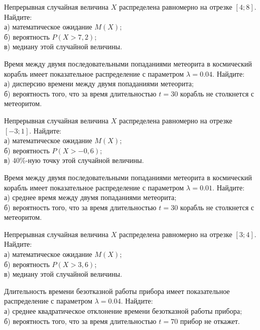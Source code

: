 \vfill

\newpage\setcounter{zad}{0}

\z Непрерывная случайная величина $X$ распределена равномерно на отрезке $[4; 8]$. Найдите: \\ \quad а) математическое ожидание $M(X)$; \\ \quad б) вероятность $P(X>7{,}2)$; \\ \quad в) медиану этой случайной величины.


\vfill

\z Время между двумя последовательными попаданиями метеорита в космический корабль имеет показательное распределение с параметром $\lambda = 0.04$. Найдите: \\ \quad а) дисперсию времени между двумя попаданиями метеорита; \\ \quad б) вероятность того, что за время длительностью $t = 30$ корабль не столкнется с метеоритом.
 

\vfill

\newpage\setcounter{zad}{0}

\z Непрерывная случайная величина $X$ распределена равномерно на отрезке $[-3; 1]$. Найдите: \\ \quad а) математическое ожидание $M(X)$; \\ \quad б) вероятность $P(X>-0{,}6)$; \\ \quad в) $40\%$-ную точку этой случайной величины.


\vfill

\z Время между двумя последовательными попаданиями метеорита в космический корабль имеет показательное распределение с параметром $\lambda = 0.01$. Найдите: \\ \quad а) среднее время между двумя попаданиями метеорита; \\ \quad б) вероятность того, что за время длительностью $t = 30$ корабль не столкнется с метеоритом.
 

\vfill

\newpage\setcounter{zad}{0}

\z Непрерывная случайная величина $X$ распределена равномерно на отрезке $[3; 4]$. Найдите: \\ \quad а) математическое ожидание $M(X)$; \\ \quad б) вероятность $P(X>3{,}6)$; \\ \quad в) медиану этой случайной величины.


\vfill

\z Длительность времени безотказной работы прибора имеет показательное распределение с параметром $\lambda = 0.04$. Найдите: \\ \quad а) среднее квадратическое отклонение времени безотказной работы прибора; \\ \quad б) вероятность того, что за время длительностью $t = 70$ прибор не откажет.
 

